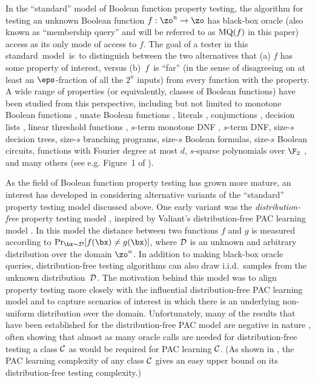 \documentclass[11pt]{article}
\theoremstyle{definition}
\begin{document}
In the ``standard'' model of Boolean function property testing, the algorithm for testing an unknown Boolean function $f: \zo^n \to \zo$ has black-box oracle (also known as ``membership query'' and will be referred to as $\mathrm{MQ}(f)$ in this paper) access as its only mode of access to $f$.  The goal of a tester in this standard~model~is~to distinguish between the two alternatives that (a) $f$ has some property of interest, versus (b)~$f$~is ``far'' (in the sense of disagreeing on at least an $\eps$-fraction of all the $2^n$ inputs) from every function with the property. A wide range of properties (or equivalently, classes of Boolean functions) have been studied from this perspective, including but not limited to monotone Boolean functions \cite{GGLRS,FLNRRS,CS13a, CS13b,CST14, CDST15,BB16,CWX17stoc,KMS18}, unate Boolean functions \cite{KhotShinkar16,CS16,LW19,CW19,CWX17stoc,CWX17focs,CW19}, literals \cite{PRS02}, conjunctions \cite{PRS02,GoldreichRon20}, decision lists \cite{DLM+:07,Bshouty20}, linear threshold functions \cite{MORS10}, $s$-term monotone DNF \cite{PRS02,DLM+:07,CGM11,Bshouty20}, $s$-term DNF, size-$s$ decision trees, size-$s$ branching programs, size-$s$ Boolean formulas, size-$s$ Boolean circuits, functions with Fourier degree at most $d$, $s$-sparse polynomials over $\F_2$ \cite{DLM+:07,CGM11,Bshouty20}, and many others (see e.g. Figure~1 of \cite{Bshouty20}).

As the field of Boolean function property testing has grown more mature, an interest has developed in considering alternative variants of the ``standard'' property testing model discussed above.  One early variant was the \emph{distribution-free} property testing model \cite{GGR98,HalevyKushilevitz:03}, inspired by Valiant's distribution-free PAC learning model \cite{Valiant:84}. In this model the distance between two functions $f$ and $g$ is measured according to $\Pr_{\bx \sim {\cal D}}[f(\bx) \ne g(\bx)]$, where ${\cal D}$ is an unknown and arbitrary distribution over the domain $\zo^n$.  In addition to making black-box oracle queries, distribution-free testing algorithms can also draw i.i.d.~samples from the unknown distribution~${\cal D}$. The motivation behind this model was to align property testing more closely with the influential distribution-free PAC learning model and to capture scenarios of interest in which there is an underlying non-uniform distribution over the domain.  Unfortunately, many of the results that have been established for the distribution-free PAC model are negative in nature \cite{HalevyKushilevitz:05,GlasnerServedio:09toc,CX16,CP22,CFP24}, often showing that almost as many oracle calls are needed for distribution-free testing a class ${\cal C}$ as would be required for PAC learning ${\cal C}$.
(As shown in \cite{GGR98}, the PAC learning complexity of any class ${\cal C}$ gives an easy upper bound on its distribution-free testing complexity.)
\end{document}
